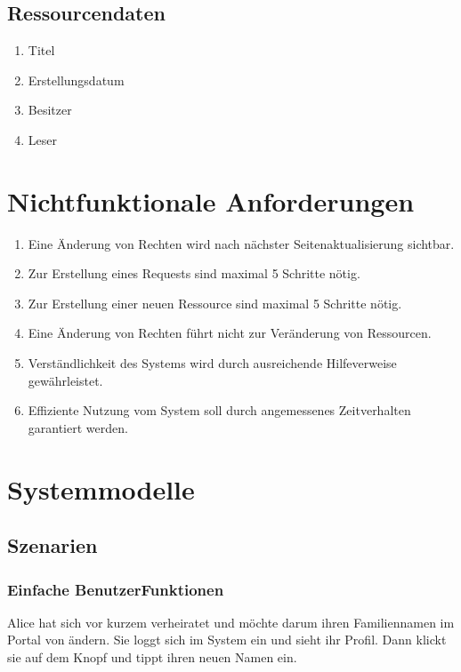 \documentclass[parskip=full,11pt]{scrartcl}
\def\threedigits#1{%
  \ifnum#1<10 0\fi
  \ifnum#1<1 0\fi
  \number#1}
\begin{document}
\subsection{Ressourcendaten}
\begin{enumerate}[label={\textbf{/D\protect\threedigits{\theenumi}0/}}, leftmargin=*, resume]
		\item Titel
		\item Erstellungsdatum
		\item Besitzer
        	\item Leser     
\end{enumerate}

\section{Nichtfunktionale Anforderungen}
\begin{enumerate}[label={\textbf{/NF\protect\threedigits{\theenumi}0/}}, leftmargin=*]
\item Eine Änderung von Rechten wird nach nächster Seitenaktualisierung sichtbar.
\item Zur Erstellung eines Requests sind maximal 5 Schritte nötig.
\item Zur Erstellung einer neuen Ressource sind maximal 5 Schritte nötig.
\item Eine Änderung von Rechten führt nicht zur Veränderung von Ressourcen.
\item Verständlichkeit des Systems wird durch ausreichende Hilfeverweise gewährleistet.
\item Effiziente Nutzung vom System soll durch angemessenes Zeitverhalten garantiert werden.  
\end{enumerate}

\newpage
\section{Systemmodelle}

\subsection{Szenarien}
\subsubsection*{Einfache BenutzerFunktionen}
Alice hat sich vor kurzem verheiratet und möchte darum ihren Familiennamen im Portal von \grqq ändern. Sie loggt sich im System ein und sieht ihr Profil. Dann klickt sie auf dem Knopf \grqq und tippt ihren neuen Namen ein. 
\end{document}
